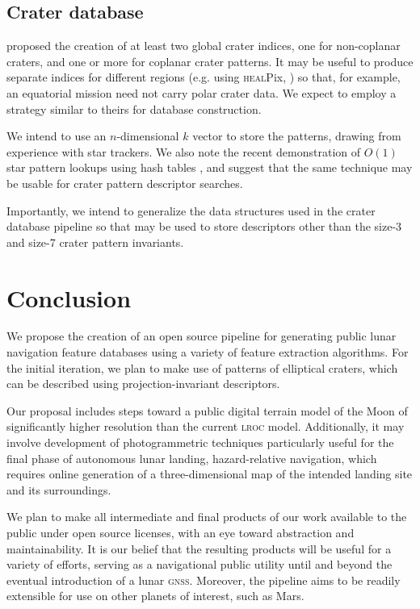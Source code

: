 \documentclass[12pt]{article}
\begin{document}
\subsection{Crater database}
\citet{Christian2020} proposed the creation of at least two global crater indices, one for non-coplanar craters, and one or more for coplanar crater patterns. It may be useful to produce separate indices for different regions (e.g. using \textsc{heal}Pix, \citet{Gorski2005}) so that, for example, an equatorial mission need not carry polar crater data. We expect to employ a strategy similar to theirs for database construction.

We intend to use an $n$-dimensional $k$ vector to store the patterns, drawing from experience with star trackers. We also note the recent demonstration of $O(1)$ star pattern lookups using hash tables \citep{Brown2017}, and suggest that the same technique may be usable for crater pattern descriptor searches.

Importantly, we intend to generalize the data structures used in the crater database pipeline so that may be used to store descriptors other than the size-3 and size-7 crater pattern invariants.

\section{Conclusion}
We propose the creation of an open source pipeline for generating public lunar navigation feature databases using a variety of feature extraction algorithms. For the initial iteration, we plan to make use of patterns of elliptical craters, which can be described using projection-invariant descriptors.

Our proposal includes steps toward a public digital terrain model of the Moon of significantly higher resolution than the current \textsc{lroc} model. Additionally, it may involve development of photogrammetric techniques particularly useful for the final phase of autonomous lunar landing, hazard-relative navigation, which requires online generation of a three-dimensional map of the intended landing site and its surroundings.

We plan to make all intermediate and final products of our work available to the public under open source licenses, with an eye toward abstraction and maintainability. It is our belief that the resulting products will be useful for a variety of efforts, serving as a navigational public utility until and beyond the eventual introduction of a lunar \textsc{gnss}. Moreover, the pipeline aims to be readily extensible for use on other planets of interest, such as Mars.


\end{document}
